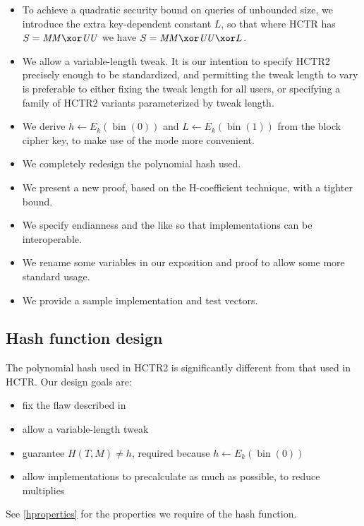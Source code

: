 \documentclass[letterpaper,11pt]{article}
\newcommand*{\MM}{\mathit{MM}}
\newcommand*{\UU}{\mathit{UU}}
\DeclareMathOperator{\fromint}{bin}
\begin{document}
\begin{itemize}
    \item To achieve a quadratic security bound
    on queries of unbounded size,
    we introduce the extra
    key-dependent constant \(L\),
    so that where HCTR has \(S = \MM \xor \UU\)
    we have \(S = \MM \xor \UU \xor L\).
    \item We allow a variable-length tweak. It is our intention to specify
    HCTR2 precisely enough to be standardized, and permitting the tweak length
    to vary is preferable to either fixing the tweak length for all users,
    or specifying a family of HCTR2 variants parameterized by tweak length.
    \item We derive \(h \gets E_k(\fromint(0))\)
    and \(L \gets E_k(\fromint(1))\) from the block cipher key, to make use of the
    mode more convenient.
    \item We completely redesign the polynomial hash used.
    \item We present a new proof, based on the H-coefficient technique,
    with a tighter bound.
    \item We specify endianness and the like so that implementations can be interoperable.
    \item We rename some variables in our exposition and proof to allow some more standard usage.
    \item We provide a sample implementation and test vectors.
\end{itemize}

\subsection{Hash function design}

The polynomial hash used in HCTR2 is significantly different from
that used in HCTR. Our design goals are:

\begin{itemize}
    \item fix the flaw described in \cite{kumarhctr}
    \item allow a variable-length tweak
    \item guarantee \(H(T, M) \neq h\), required
    because \(h \gets E_k(\fromint(0))\)
    \item allow implementations to precalculate as much as possible, to reduce multiplies
\end{itemize}

See \autoref{hproperties}
for the properties we require of the hash function.
\end{document}
